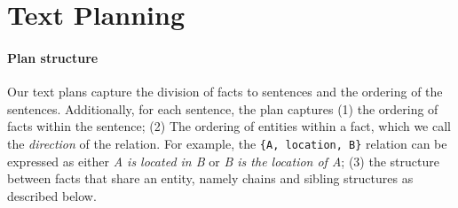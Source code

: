 \documentclass[11pt,a4paper]{article}
\begin{document}
\section{Text Planning} \label{sec:plan-structure}

\paragraph{Plan structure}
Our text plans capture the division of facts to sentences and the ordering of the sentences. Additionally, for each sentence, the plan captures
(1) the ordering of facts within the sentence; 
(2) The ordering of entities within a fact, which we call the \emph{direction} of the relation. For example, the \texttt{\{A, location, B\}} relation can be expressed as either \emph{A is located in B} or \emph{B is the location of A}; 
(3) the structure between facts that share an entity, namely chains and sibling structures as described below.
\end{document}
